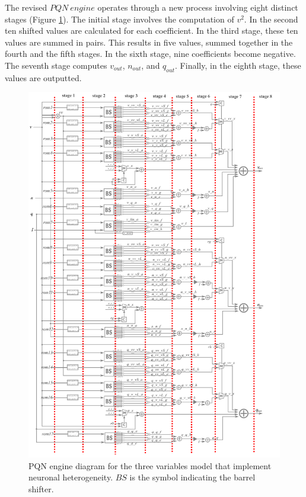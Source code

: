 The revised $PQN\ engine$ operates through a new process involving eight distinct stages (Figure \ref{fig:8stages}). 
The initial stage involves the computation of \(v^2\). In the second ten shifted 
values are calculated for each coefficient. In the third stage, these ten values 
are summed in pairs. This results in five values, summed together in the fourth 
and the fifth stages. In the sixth stage, nine coefficients become negative. The 
seventh stage computes \(v_{out}\), \(n_{out}\), and \(q_{out}\). Finally, in the 
eighth stage, these values are outputted.\\

\begin{figure}[hbt!]
    \begin{center}
    \includegraphics[width=0.84\linewidth]{img/block_diagram2.png}
    \end{center}
    \caption[$PQN\ engine$ pipeline for variable coefficients]{PQN engine diagram for the three variables model that implement neuronal heterogeneity. $BS$ is the symbol indicating the barrel shifter.}
    \label{fig:8stages}
\end{figure}

